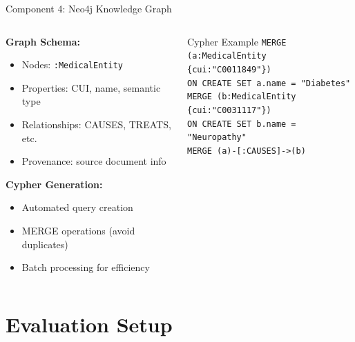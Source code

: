 \documentclass[aspectratio=169, 11pt]{beamer}
\begin{document}
\begin{frame}{Component 4: Neo4j Knowledge Graph}
    \begin{columns}
        \begin{column}{0.5\textwidth}
            \textbf{Graph Schema:}
            \begin{itemize}
                \item Nodes: \texttt{:MedicalEntity}
                \item Properties: CUI, name, semantic type
                \item Relationships: CAUSES, TREATS, etc.
                \item Provenance: source document info
            \end{itemize}
            
            \textbf{Cypher Generation:}
            \begin{itemize}
                \item Automated query creation
                \item MERGE operations (avoid duplicates)
                \item Batch processing for efficiency
            \end{itemize}
        \end{column}
        \begin{column}{0.5\textwidth}
            \begin{exampleblock}{Cypher Example}
                \footnotesize
                \texttt{MERGE (a:MedicalEntity \\
                \hspace{1cm}\{cui:"C0011849"\})\\
                ON CREATE SET a.name = "Diabetes"\\[0.3cm]
                MERGE (b:MedicalEntity \\
                \hspace{1cm}\{cui:"C0031117"\})\\
                ON CREATE SET b.name = "Neuropathy"\\[0.3cm]
                MERGE (a)-[:CAUSES]->(b)}
            \end{exampleblock}
        \end{column}
    \end{columns}
\end{frame}

\section{Evaluation Setup}
\end{document}
